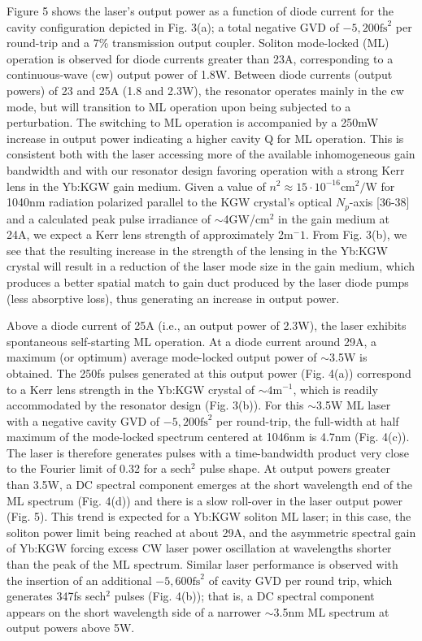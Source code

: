 Figure 5 shows the laser's output power as a function of diode current for the cavity configuration depicted in Fig. 3(a); a total negative GVD of $-5,200\text{fs}^2$ per round-trip and a 7\% transmission output coupler.
Soliton mode-locked (ML) operation is observed for diode currents greater than 23A, corresponding to a continuous-wave (cw) output power of 1.8W.
Between diode currents (output powers) of 23 and 25A (1.8 and 2.3W), the resonator operates mainly in the cw mode, but will transition to ML operation upon being subjected to a perturbation.
The switching to ML operation is accompanied by a 250mW increase in output
power indicating a higher cavity Q for ML operation.
This is consistent both with the laser accessing more of the available inhomogeneous gain bandwidth and with our resonator design favoring operation with a strong Kerr lens in the Yb:KGW gain medium.
Given a value of $n^2 \approx 15 \cdot 10^{-16}\text{cm}^2/\text{W}$ for 1040nm radiation polarized parallel to the KGW crystal’s optical $N_p$-axis [36-38] and a calculated peak pulse irradiance of $\sim$4GW/cm$^2$ in the gain medium at 24A, we expect a Kerr lens strength of approximately 2m$^-1$.
From Fig. 3(b), we see that the resulting increase in the strength of the lensing in the Yb:KGW crystal will result in a reduction of the laser mode size in the gain medium, which produces a better spatial match to gain duct produced by the laser diode pumps (less absorptive loss), thus generating an increase in output power.


Above a diode current of 25A (i.e., an output power of 2.3W), the laser exhibits spontaneous self-starting ML operation.
At a diode current around 29A, a maximum (or optimum) average mode-locked output power of $\sim$3.5W is obtained.
The 250fs pulses generated at this output power (Fig. 4(a)) correspond to a Kerr lens strength in the Yb:KGW crystal of $\sim4 \text{m}^{-1}$, which is readily accommodated by the resonator design (Fig. 3(b)).
For this $\sim$3.5W ML laser with a negative cavity GVD of $-5,200\text{fs}^2$ per round-trip, the full-width at
half maximum of the mode-locked spectrum centered at 1046nm is 4.7nm (Fig. 4(c)).
The laser is therefore generates pulses with a time-bandwidth product very close to the Fourier limit of 0.32 for a sech$^2$ pulse shape.
At output powers greater than 3.5W, a DC spectral component emerges at the short wavelength end of the ML spectrum (Fig. 4(d)) and there is a slow roll-over in the laser output power (Fig. 5).
This trend is expected for a Yb:KGW soliton ML laser; in this case, the soliton power limit being reached at about 29A, and the asymmetric spectral gain of Yb:KGW forcing excess CW laser power oscillation at wavelengths shorter than the peak of the ML spectrum.
Similar laser performance is observed with the insertion of an additional $-5,600\text{fs}^2$ of cavity GVD per round trip, which generates 347fs sech$^2$ pulses (Fig. 4(b)); that is, a DC spectral component appears on the short wavelength side of a narrower $\sim$3.5nm ML spectrum at output powers above 5W.

